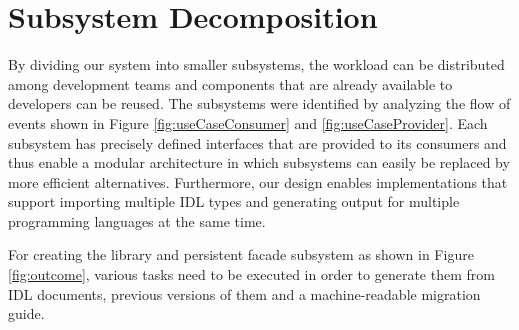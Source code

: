 \section{Subsystem Decomposition}
\label{sec:SubsystemDecomposition}

By dividing our system into smaller subsystems, the workload can be distributed among development teams and components that are already available to developers can be reused. The subsystems were identified by analyzing the flow of events shown in Figure \ref{fig:useCaseConsumer} and \ref{fig:useCaseProvider}. Each subsystem has precisely defined interfaces that are provided to its consumers and thus enable a modular architecture in which subsystems can easily be replaced by more efficient alternatives. Furthermore, our design enables implementations that support importing multiple IDL types and generating output for multiple programming languages at the same time. 

\begin{figure}[h]
\end{figure}

For creating the library and persistent facade subsystem as shown in Figure \ref{fig:outcome}, various tasks need to be executed in order to generate them from IDL documents, previous versions of them and a machine-readable migration guide. 

